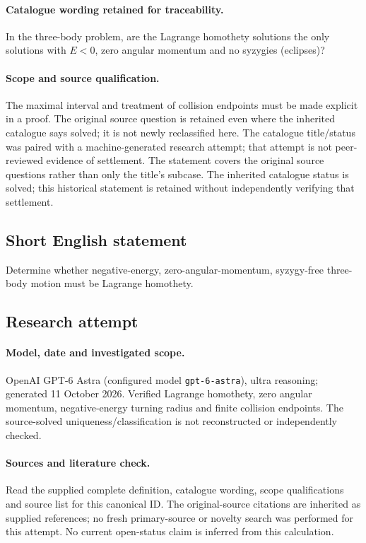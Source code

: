 \documentclass[11pt]{article}
\begin{document}
\paragraph{Catalogue wording retained for traceability.}
In the three-body problem, are the Lagrange homothety solutions the only solutions with $E<0$, zero angular momentum and no syzygies (eclipses)?
\paragraph{Scope and source qualification.}The maximal interval and treatment of collision endpoints must be made explicit in a proof. The original source question is retained even where the inherited catalogue says solved; it is not newly reclassified here. The catalogue title/status was paired with a machine-generated research attempt; that attempt is not peer-reviewed evidence of settlement. The statement covers the original source questions rather than only the title’s subcase. The inherited catalogue status is solved; this historical statement is retained without independently verifying that settlement.
\subsection{Short English statement}
Determine whether negative-energy, zero-angular-momentum, syzygy-free three-body motion must be Lagrange homothety.
\subsection{Research attempt}
\paragraph{Model, date and investigated scope.}
OpenAI GPT-6 Astra (configured model \texttt{gpt-6-astra}), ultra reasoning; generated 11 October 2026. Verified Lagrange homothety, zero angular momentum, negative-energy turning radius and finite collision endpoints. The source-solved uniqueness/classification is not reconstructed or independently checked.

\paragraph{Sources and literature check.}
Read the supplied complete definition, catalogue wording, scope qualifications and source list for this canonical ID. The original-source citations are inherited as supplied references; no fresh primary-source or novelty search was performed for this attempt. No current open-status claim is inferred from this calculation.
\end{document}
